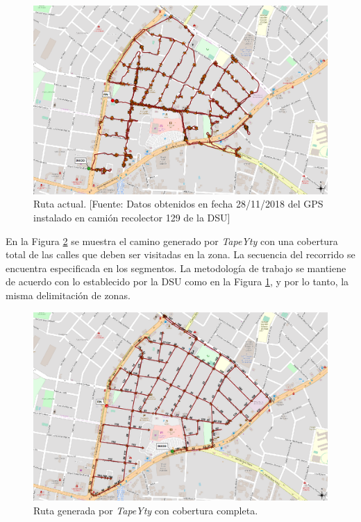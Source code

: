 \begin{figure}[htbp]
    \centering
    \includegraphics[width=\textwidth]{recorridoActual83.png}
    \caption{Ruta actual. [Fuente: Datos obtenidos en fecha 28/11/2018 del GPS instalado en camión recolector 129 de la DSU]}
    \label{fig:RecorridoActualZona83}
\end{figure}

En la Figura \ref{fig:RecorridoTapeYtyZona83} se muestra el camino generado por \textit{TapeYty} con una cobertura total de las calles que deben ser visitadas en la zona. La secuencia del recorrido se encuentra especificada en los segmentos. La metodología de trabajo se mantiene de acuerdo con lo establecido por la DSU como en la Figura \ref{fig:RecorridoActualZona83}, y por lo tanto, la misma delimitación de zonas.

\begin{figure}[htbp]
    \centering
    \includegraphics[width=\textwidth]{recorrido83CoberturaTotal.png}
    \caption{Ruta generada por \textit{TapeYty} con cobertura completa.}
    \label{fig:RecorridoTapeYtyZona83}
\end{figure}


